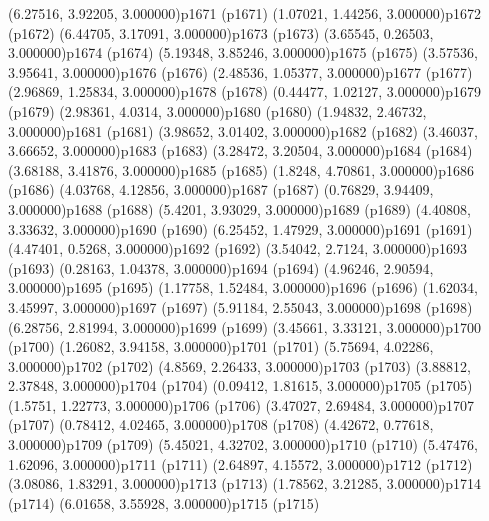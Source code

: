 \psPoint(6.27516, 3.92205, 3.000000){p1671}
\psdot(p1671)
\psPoint(1.07021, 1.44256, 3.000000){p1672}
\psdot(p1672)
\psPoint(6.44705, 3.17091, 3.000000){p1673}
\psdot(p1673)
\psPoint(3.65545, 0.26503, 3.000000){p1674}
\psdot(p1674)
\psPoint(5.19348, 3.85246, 3.000000){p1675}
\psdot(p1675)
\psPoint(3.57536, 3.95641, 3.000000){p1676}
\psdot(p1676)
\psPoint(2.48536, 1.05377, 3.000000){p1677}
\psdot(p1677)
\psPoint(2.96869, 1.25834, 3.000000){p1678}
\psdot(p1678)
\psPoint(0.44477, 1.02127, 3.000000){p1679}
\psdot(p1679)
\psPoint(2.98361, 4.0314, 3.000000){p1680}
\psdot(p1680)
\psPoint(1.94832, 2.46732, 3.000000){p1681}
\psdot(p1681)
\psPoint(3.98652, 3.01402, 3.000000){p1682}
\psdot(p1682)
\psPoint(3.46037, 3.66652, 3.000000){p1683}
\psdot(p1683)
\psPoint(3.28472, 3.20504, 3.000000){p1684}
\psdot(p1684)
\psPoint(3.68188, 3.41876, 3.000000){p1685}
\psdot(p1685)
\psPoint(1.8248, 4.70861, 3.000000){p1686}
\psdot(p1686)
\psPoint(4.03768, 4.12856, 3.000000){p1687}
\psdot(p1687)
\psPoint(0.76829, 3.94409, 3.000000){p1688}
\psdot(p1688)
\psPoint(5.4201, 3.93029, 3.000000){p1689}
\psdot(p1689)
\psPoint(4.40808, 3.33632, 3.000000){p1690}
\psdot(p1690)
\psPoint(6.25452, 1.47929, 3.000000){p1691}
\psdot(p1691)
\psPoint(4.47401, 0.5268, 3.000000){p1692}
\psdot(p1692)
\psPoint(3.54042, 2.7124, 3.000000){p1693}
\psdot(p1693)
\psPoint(0.28163, 1.04378, 3.000000){p1694}
\psdot(p1694)
\psPoint(4.96246, 2.90594, 3.000000){p1695}
\psdot(p1695)
\psPoint(1.17758, 1.52484, 3.000000){p1696}
\psdot(p1696)
\psPoint(1.62034, 3.45997, 3.000000){p1697}
\psdot(p1697)
\psPoint(5.91184, 2.55043, 3.000000){p1698}
\psdot(p1698)
\psPoint(6.28756, 2.81994, 3.000000){p1699}
\psdot(p1699)
\psPoint(3.45661, 3.33121, 3.000000){p1700}
\psdot(p1700)
\psPoint(1.26082, 3.94158, 3.000000){p1701}
\psdot(p1701)
\psPoint(5.75694, 4.02286, 3.000000){p1702}
\psdot(p1702)
\psPoint(4.8569, 2.26433, 3.000000){p1703}
\psdot(p1703)
\psPoint(3.88812, 2.37848, 3.000000){p1704}
\psdot(p1704)
\psPoint(0.09412, 1.81615, 3.000000){p1705}
\psdot(p1705)
\psPoint(1.5751, 1.22773, 3.000000){p1706}
\psdot(p1706)
\psPoint(3.47027, 2.69484, 3.000000){p1707}
\psdot(p1707)
\psPoint(0.78412, 4.02465, 3.000000){p1708}
\psdot(p1708)
\psPoint(4.42672, 0.77618, 3.000000){p1709}
\psdot(p1709)
\psPoint(5.45021, 4.32702, 3.000000){p1710}
\psdot(p1710)
\psPoint(5.47476, 1.62096, 3.000000){p1711}
\psdot(p1711)
\psPoint(2.64897, 4.15572, 3.000000){p1712}
\psdot(p1712)
\psPoint(3.08086, 1.83291, 3.000000){p1713}
\psdot(p1713)
\psPoint(1.78562, 3.21285, 3.000000){p1714}
\psdot(p1714)
\psPoint(6.01658, 3.55928, 3.000000){p1715}
\psdot(p1715)
